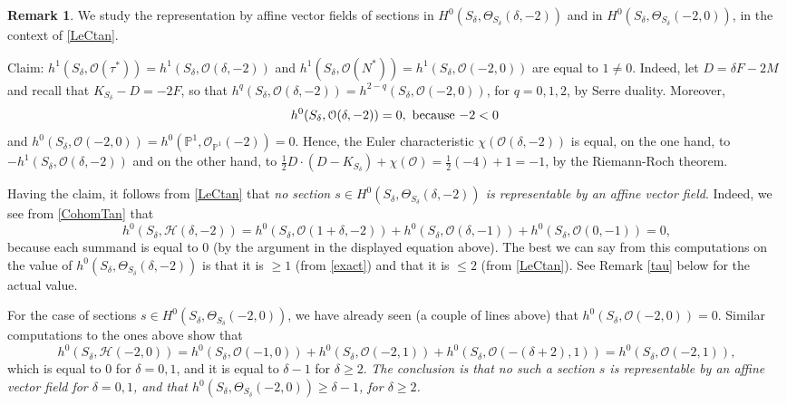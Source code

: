 \documentclass{amsart} %
\theoremstyle{definition}
\newtheorem{remark}[theorem]{Remark}
\newcommand{\cs}{S_{\delta}}
\newcommand{\PP}{\mathbb{P}}
\newcommand{\mcO}{\mathcal{O}}
\newcommand{\mcH}{\mathcal{H}}
\begin{document}
\begin{remark}\label{tauene}
We study the representation by affine vector fields
 of sections in $ H^0(S_{\delta}, \Theta_{S_{\delta}}(\delta,-2) ) $ and in
 $ H^0(S_{\delta}, \Theta_{S_{\delta}}(-2, 0) ) $, in the context of \eqref{LeCtan}.

Claim:
 $ h^1(S_{\delta}, \mcO(\tau^*) ) = h^1(S_{\delta}, \mcO(\delta,-2) ) $ and
 $ h^1(S_{\delta}, \mcO(N^*) ) = h^1(S_{\delta}, \mcO(-2,0) ) $  are equal to $ 1 \neq 0 $.
Indeed, let $ D = \delta F -2 M  $ and recall that $ K_{\cs} - D = -2 F $, so that
$ h^q(S_{\delta}, \mcO(\delta,-2) ) = h^{2-q}(S_{\delta}, \mcO(-2,0) ) $, for $ q = 0,1,2 $,
by Serre duality. Moreover,
\[
 h^0(S_{\delta}, \mcO(\delta,-2) )=0,  \text{  because $ -2 < 0 $ }
\]
and $ h^{0}(S_{\delta}, \mcO(-2,0) ) = h^{0}(\PP^1, \mcO_{\PP^1}(-2) ) = 0 $. Hence, the Euler
characteristic $ \chi( \mcO(\delta,-2) ) $ is equal, on the one hand, to $ - h^1(S_{\delta}, \mcO(\delta,-2) )$
and on the other hand, to $ \frac{1}{2} D\cdot(D - K_{\cs}) + \chi( \mcO ) = \frac{1}{2}(-4) + 1 = -1 $, by the Riemann-Roch theorem.

Having the claim, it follows from \eqref{LeCtan} that
\textit{no section $ s \in H^0(S_{\delta}, \Theta_{S_{\delta}}(\delta,-2) ) $
is representable by an affine vector field}. Indeed, we see from \eqref{CohomTan} that
$$ h^0(S_{\delta}, \mcH(\delta,-2)) =
   h^0(S_{\delta}, \mcO(1+\delta, -2))+
   h^0(S_{\delta}, \mcO(\delta, -1))+
   h^0(S_{\delta}, \mcO(0, -1)) = 0, $$
because each summand is equal to $ 0 $
(by the argument in the displayed equation above).
The best we can say from this computations on the value of
$ h^0(S_{\delta}, \Theta_{S_{\delta}}(\delta,-2) ) $ is that it is $ \geq 1 $ (from \eqref{exact})
and that it is $ \leq 2 $ (from \eqref{LeCtan}). See Remark \ref{tau} below for the actual value.

For the case of sections $ s \in H^0(S_{\delta}, \Theta_{S_{\delta}}(-2, 0) ) $, we have already seen (a couple of lines above) that $ h^0(S_{\delta}, \mcO(-2, 0) ) = 0 $.
Similar computations to the ones above %
show that
$$ h^0(S_{\delta}, \mcH(-2,0)) =
   h^0(S_{\delta}, \mcO(-1, 0))+
   h^0(S_{\delta}, \mcO(-2, 1))+
   h^0(S_{\delta}, \mcO(-(\delta+2), 1)) = h^0(S_{\delta}, \mcO(-2, 1)), $$ which is
equal to $ 0 $ for $ \delta = 0, 1 $, and it is equal to $ \delta-1 $ for $ \delta \geq 2 $.
\textit{The conclusion is that no
such a section $ s $ is representable by an affine vector field for $ \delta = 0, 1 $, and that
$ h^0(S_{\delta}, \Theta_{S_{\delta}}(-2, 0) ) \geq \delta-1 $, for $ \delta \geq 2 $.}


\end{remark}
\end{document}
